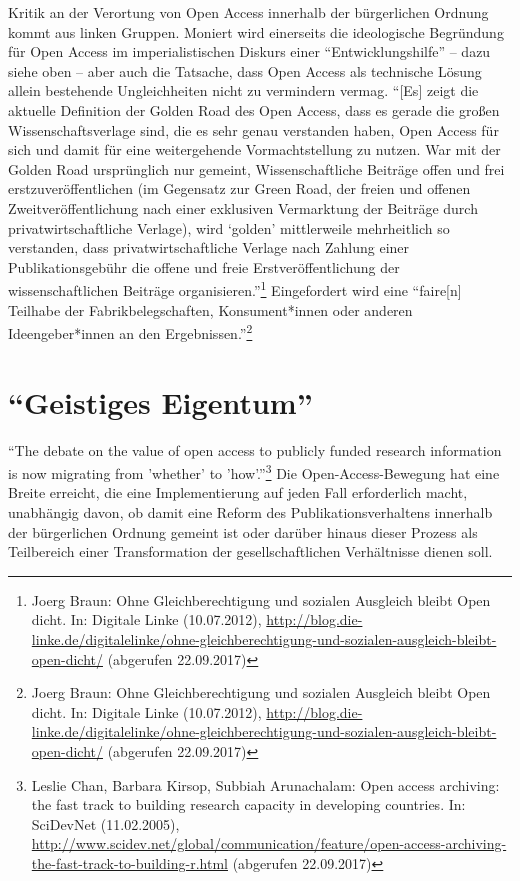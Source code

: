 \documentclass[a4paper,
fontsize=11pt,
oneside,
numbers=noperiodatend,
parskip=half-,
bibliography=totoc,
final
]{scrartcl}
\begin{document}
Kritik an der Verortung von Open Access innerhalb der bürgerlichen
Ordnung kommt aus linken Gruppen. Moniert wird einerseits die
ideologische Begründung für Open Access im imperialistischen Diskurs
einer \enquote{Entwicklungshilfe} -- dazu siehe oben -- aber auch die
Tatsache, dass Open Access als technische Lösung allein bestehende
Ungleichheiten nicht zu vermindern vermag. \enquote{{[}Es{]} zeigt die
aktuelle Definition der Golden Road des Open Access, dass es gerade die
großen Wissenschaftsverlage sind, die es sehr genau verstanden haben,
Open Access für sich und damit für eine weitergehende Vormachtstellung
zu nutzen. War mit der Golden Road ursprünglich nur gemeint,
Wissenschaftliche Beiträge offen und frei erstzuveröffentlichen (im
Gegensatz zur Green Road, der freien und offenen Zweitveröffentlichung
nach einer exklusiven Vermarktung der Beiträge durch
privatwirtschaftliche Verlage), wird \enquote{golden} mittlerweile
mehrheitlich so verstanden, dass privatwirtschaftliche Verlage nach
Zahlung einer Publikationsgebühr die offene und freie
Erstveröffentlichung der wissenschaftlichen Beiträge
organisieren.}\footnote{Joerg Braun: Ohne Gleichberechtigung und
  sozialen Ausgleich bleibt Open dicht. In: Digitale Linke (10.07.2012),
  \url{http://blog.die-linke.de/digitalelinke/ohne-gleichberechtigung-und-sozialen-ausgleich-bleibt-open-dicht/}
  (abgerufen 22.09.2017)} Eingefordert wird eine \enquote{faire{[}n{]}
Teilhabe der Fabrikbelegschaften, Konsument*innen oder anderen
Ideengeber*innen an den Ergebnissen.}\footnote{Joerg Braun: Ohne
  Gleichberechtigung und sozialen Ausgleich bleibt Open dicht. In:
  Digitale Linke (10.07.2012),
  \url{http://blog.die-linke.de/digitalelinke/ohne-gleichberechtigung-und-sozialen-ausgleich-bleibt-open-dicht/}
  (abgerufen 22.09.2017)}

\hypertarget{geistiges-eigentum}{%
\section*{\texorpdfstring{\enquote{Geistiges
Eigentum}}{``Geistiges Eigentum''}}\label{geistiges-eigentum}}

\enquote{The debate on the value of open access to publicly funded
research information is now migrating from 'whether' to
'how'.}\footnote{Leslie Chan, Barbara Kirsop, Subbiah Arunachalam: Open
  access archiving: the fast track to building research capacity in
  developing countries. In: SciDevNet (11.02.2005),
  \url{http://www.scidev.net/global/communication/feature/open-access-archiving-the-fast-track-to-building-r.html}
  (abgerufen 22.09.2017)} Die Open-Access-Bewegung hat eine Breite
erreicht, die eine Implementierung auf jeden Fall erforderlich macht,
unabhängig davon, ob damit eine Reform des Publikationsverhaltens
innerhalb der bürgerlichen Ordnung gemeint ist oder darüber hinaus
dieser Prozess als Teilbereich einer Transformation der
gesellschaftlichen Verhältnisse dienen soll.
\end{document}
